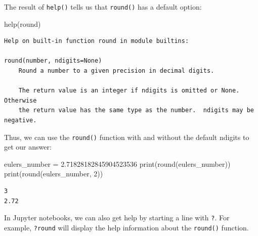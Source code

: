 \documentclass[
  letterpaper,
  DIV=11,
  numbers=noendperiod]{scrreprt}
\newenvironment{Shaded}{\begin{snugshade}}{\end{snugshade}}
\newcommand{\BuiltInTok}[1]{\textcolor[rgb]{0.00,0.23,0.31}{#1}}
\newcommand{\DecValTok}[1]{\textcolor[rgb]{0.68,0.00,0.00}{#1}}
\newcommand{\FloatTok}[1]{\textcolor[rgb]{0.68,0.00,0.00}{#1}}
\newcommand{\NormalTok}[1]{\textcolor[rgb]{0.00,0.23,0.31}{#1}}
\newcommand{\OperatorTok}[1]{\textcolor[rgb]{0.37,0.37,0.37}{#1}}
\begin{document}
\begin{tcolorbox}[enhanced jigsaw, rightrule=.15mm, opacitybacktitle=0.6, colback=white, toprule=.15mm, colframe=quarto-callout-note-color-frame, bottomtitle=1mm, bottomrule=.15mm, arc=.35mm, coltitle=black, breakable, title={Solution to Challenge 4}, titlerule=0mm, opacityback=0, colbacktitle=quarto-callout-note-color!10!white, left=2mm, toptitle=1mm, leftrule=.75mm]

The result of \texttt{help()} tells us that \texttt{round()} has a
default option:

\begin{Shaded}
\begin{Highlighting}[]
\BuiltInTok{help}\NormalTok{(}\BuiltInTok{round}\NormalTok{)}
\end{Highlighting}
\end{Shaded}

\begin{verbatim}
Help on built-in function round in module builtins:

round(number, ndigits=None)
    Round a number to a given precision in decimal digits.
    
    The return value is an integer if ndigits is omitted or None.  Otherwise
    the return value has the same type as the number.  ndigits may be negative.
\end{verbatim}

Thus, we can use the \texttt{round()} function with and without the
default ndigits to get our answer:

\begin{Shaded}
\begin{Highlighting}[]
\NormalTok{eulers\_number }\OperatorTok{=} \FloatTok{2.71828182845904523536}
\BuiltInTok{print}\NormalTok{(}\BuiltInTok{round}\NormalTok{(eulers\_number))}
\BuiltInTok{print}\NormalTok{(}\BuiltInTok{round}\NormalTok{(eulers\_number, }\DecValTok{2}\NormalTok{))}
\end{Highlighting}
\end{Shaded}

\begin{verbatim}
3
2.72
\end{verbatim}

\end{tcolorbox}

\begin{tcolorbox}[enhanced jigsaw, rightrule=.15mm, opacitybacktitle=0.6, colback=white, toprule=.15mm, colframe=quarto-callout-tip-color-frame, bottomtitle=1mm, bottomrule=.15mm, arc=.35mm, coltitle=black, breakable, title=\textcolor{quarto-callout-tip-color}{\faLightbulb}\hspace{0.5em}{Help in Jupyter Lab!}, titlerule=0mm, opacityback=0, colbacktitle=quarto-callout-tip-color!10!white, left=2mm, toptitle=1mm, leftrule=.75mm]
In Jupyter notebooks, we can also get help by starting a line with
\texttt{?}. For example, \texttt{?round} will display the help
information about the \texttt{round()} function.
\end{tcolorbox}
\end{document}
